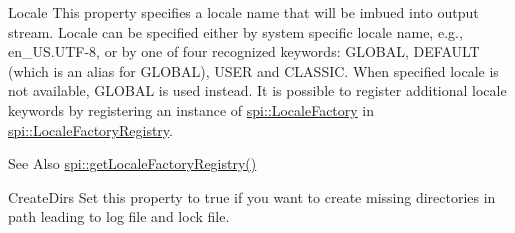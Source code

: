 \begin{DoxyDescription}
\item[{\ttfamily Locale} ]This property specifies a locale name that will be imbued into output stream. Locale can be specified either by system specific locale name, e.\-g., {\ttfamily en\-\_\-\-U\-S.\-U\-T\-F-\/8}, or by one of four recognized keywords\-: {\ttfamily G\-L\-O\-B\-A\-L}, {\ttfamily D\-E\-F\-A\-U\-L\-T} (which is an alias for {\ttfamily G\-L\-O\-B\-A\-L}), {\ttfamily U\-S\-E\-R} and {\ttfamily C\-L\-A\-S\-S\-I\-C}. When specified locale is not available, {\ttfamily G\-L\-O\-B\-A\-L} is used instead. It is possible to register additional locale keywords by registering an instance of {\ttfamily \hyperlink{classlog4cplus_1_1spi_1_1LocaleFactory}{spi\-::\-Locale\-Factory}} in {\ttfamily \hyperlink{namespacelog4cplus_1_1spi_ae93cf5d075d4355919917879db043004}{spi\-::\-Locale\-Factory\-Registry}}. \begin{DoxySeeAlso}{See Also}
\hyperlink{namespacelog4cplus_1_1spi_a1204090fdb7f5da78c94348e13f8c3e1}{spi\-::get\-Locale\-Factory\-Registry()} 
\end{DoxySeeAlso}

\item[{\ttfamily Create\-Dirs} ]Set this property to {\ttfamily true} if you want to create missing directories in path leading to log file and lock file.  
\end{DoxyDescription}

